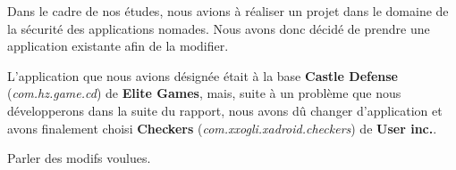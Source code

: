 Dans le cadre de nos études, nous avions à réaliser un projet dans le domaine de la sécurité des applications nomades.
Nous avons donc décidé de prendre une application existante afin de la modifier.

L'application que nous avions désignée était à la base \textbf{Castle Defense} (\textit{com.hz.game.cd}) de \textbf{Elite Games},
mais, suite à un problème que nous développerons dans la suite du rapport,
nous avons dû changer d'application et avons finalement choisi \textbf{Checkers}
(\textit{com.xxogli.xadroid.checkers}) de \textbf{User inc.}.

Parler des modifs voulues. %
